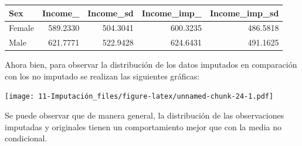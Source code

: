 \documentclass[
  12pt,
]{book}
\newenvironment{Shaded}{\begin{snugshade}}{\end{snugshade}}
\newcommand{\AttributeTok}[1]{\textcolor[rgb]{0.77,0.63,0.00}{#1}}
\newcommand{\FloatTok}[1]{\textcolor[rgb]{0.00,0.00,0.81}{#1}}
\newcommand{\FunctionTok}[1]{\textcolor[rgb]{0.00,0.00,0.00}{#1}}
\newcommand{\NormalTok}[1]{#1}
\newcommand{\OtherTok}[1]{\textcolor[rgb]{0.56,0.35,0.01}{#1}}
\newcommand{\SpecialCharTok}[1]{\textcolor[rgb]{0.00,0.00,0.00}{#1}}
\newcommand{\StringTok}[1]{\textcolor[rgb]{0.31,0.60,0.02}{#1}}
\begin{document}
\begin{tabular}{l|r|r|r|r}
\hline
Sex & Income\_ & Income\_sd & Income\_imp\_ & Income\_imp\_sd\\
\hline
Female & 589.2330 & 504.3041 & 600.3235 & 486.5818\\
\hline
Male & 621.7771 & 522.9428 & 624.6431 & 491.1625\\
\hline
\end{tabular}

Ahora bien, para observar la distribución de los datos imputados en comparación con los no imputado se realizan las siguientes gráficas:

\begin{Shaded}
\end{Shaded}

\texttt{[image: 11-Imputación\_files/figure-latex/unnamed-chunk-24-1.pdf]}

Se puede observar que de manera general, la distribución de las observaciones imputadas y originales tienen un comportamiento mejor que con la media no condicional.
\end{document}
